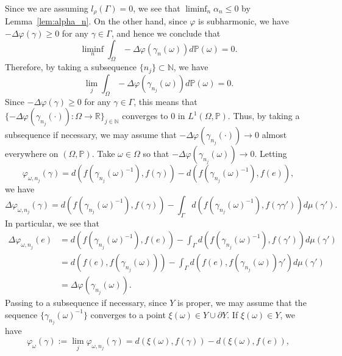 \documentclass[12pt]{amsart}
\numberwithin{equation}{section}
\theoremstyle{plain}
\theoremstyle{definition}
\theoremstyle{remark}
\newcommand{\R}{{\mathbb R}}
\newcommand{\N}{{\mathbb N}}
\begin{document}
Since we are assuming $l_{\rho}(\Gamma)=0$, we see that 
$\liminf_n \alpha_n\leq 0$ by Lemma~\ref{lem:alpha_n}.  
On the other hand, since $\varphi$ is subharmonic, we have
$-\Delta \varphi(\gamma)\geq 0$ for any $\gamma \in \Gamma$, 
and hence we conclude that
\begin{equation*}
 \liminf_{n} \int_{\Omega} -\Delta \varphi(\gamma_n(\omega))
 d\mathbb{P}(\omega) = 0. 
\end{equation*}
Therefore, by taking a subsequence $\{n_j\}\subset \N$, we have 
\begin{equation*}
 \lim_{j} \int_{\Omega} -\Delta \varphi(\gamma_{n_j}(\omega))
 d\mathbb{P}(\omega) = 0.
\end{equation*}
Since $-\Delta \varphi(\gamma) \geq 0$ for any $\gamma \in \Gamma$, this means
that 
$\{-\Delta \varphi(\gamma_{n_j}(\cdot))\colon \Omega \rightarrow \R\}_{j\in \N}$
converges to $0$ in $L^1(\Omega,\mathbb{P})$. 
Thus, by taking a subsequence if necessary, we may assume that 
$-\Delta \varphi(\gamma_{n_j}(\cdot)) \to 0$ almost everywhere on 
$(\Omega,\mathbb{P})$. 
Take $\omega \in \Omega$ so that 
$-\Delta\varphi(\gamma_{n_j}(\omega))\to 0$. 
Letting
\begin{equation*}
 \varphi_{\omega, n_j}(\gamma)
 = d(f(\gamma_{n_j}(\omega)^{-1}), f(\gamma)) - 
 d(f(\gamma_{n_j}(\omega)^{-1}), f(e)), 
\end{equation*}
we have
\begin{equation*}
 \Delta \varphi_{\omega, n_j} (\gamma)
 = d(f(\gamma_{n_j}(\omega)^{-1}), f(\gamma))
 - \int_{\Gamma}
 d(f(\gamma_{n_j}(\omega)^{-1}), f(\gamma \gamma')) d\mu(\gamma'). 
\end{equation*}
In particular, we see that 
\begin{equation*}
\begin{split}
 \Delta \varphi_{\omega, n_j} (e)
 & = d(f(\gamma_{n_j}(\omega)^{{-1}}), f(e))
 - \int_{\Gamma}
 d(f(\gamma_{n_j}(\omega)^{-1}), f(\gamma')) d\mu(\gamma') \\
 & = d(f(e), f(\gamma_{n_j}(\omega))) - 
 \int_{\Gamma}d(f(e), f(\gamma_{n_j}(\omega))\gamma')d \mu(\gamma') \\
 & = \Delta \varphi(\gamma_{n_j}(\omega)). 
\end{split}
\end{equation*}
Passing to a subsequence if necessary, since $Y$ is proper, we may
assume that the sequence $\{\gamma_{n_j}(\omega)^{-1}\}$ converges to a
point $\xi(\omega) \in Y\cup \partial Y$.
If  $\xi(\omega) \in Y$, we have
 \begin{equation*}
 \varphi_{\omega}(\gamma) := \lim_j \varphi_{\omega, n_j}(\gamma) 
 = d(\xi(\omega), f(\gamma)) - d(\xi(\omega), f(e)), 
 \end{equation*}
\end{document}
